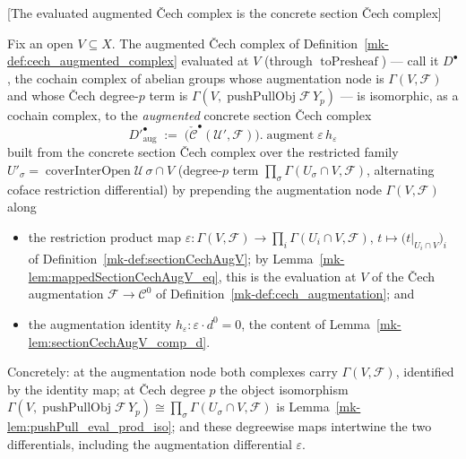 \begin{lemma}

[The evaluated augmented {\v C}ech complex is the concrete section {\v C}ech complex]
  \label{mk-lem:cechSection_complex_iso}

  Fix an open \(V \subseteq X\). The augmented {\v C}ech complex of
  Definition~\ref{mk-def:cech_augmented_complex} evaluated at \(V\) (through
  \(\operatorname{toPresheaf}\)) --- call it \(D^\bullet\), the cochain complex of abelian
  groups whose augmentation node is \(\Gamma(V, \mathcal{F})\) and whose {\v C}ech degree-\(p\)
  term is \(\Gamma(V, \operatorname{pushPullObj}\mathcal{F}\,Y_p)\) --- is isomorphic, as a
  cochain complex, to the \emph{augmented} concrete section {\v C}ech complex
  \[
    D'^\bullet_{\mathrm{aug}} \;:=\;
    \bigl(\check{\mathcal{C}}^\bullet(\mathcal{U}', \mathcal{F})\bigr).\operatorname{augment}
      \varepsilon\, h_\varepsilon
  \]
  built from the concrete section {\v C}ech complex over the restricted family
  \(U'_\sigma = \operatorname{coverInterOpen}\mathcal{U}\,\sigma \cap V\) (degree-\(p\) term
  \(\prod_\sigma \Gamma(U_\sigma \cap V, \mathcal{F})\), alternating coface restriction
  differential) by prepending the augmentation node \(\Gamma(V, \mathcal{F})\) along
  \begin{itemize}
    \item the restriction product map \(\varepsilon : \Gamma(V, \mathcal{F}) \to
      \prod_i \Gamma(U_i \cap V, \mathcal{F})\), \(t \mapsto \bigl(t|_{U_i \cap V}\bigr)_i\)
      of Definition~\ref{mk-def:sectionCechAugV}; by
      Lemma~\ref{mk-lem:mappedSectionCechAugV_eq}, this is the evaluation at \(V\) of the {\v C}ech
      augmentation \(\mathcal{F} \to \mathcal{C}^0\) of Definition~\ref{mk-def:cech_augmentation}; and
    \item the augmentation identity \(h_\varepsilon : \varepsilon \cdot d^0 = 0\), the
      content of Lemma~\ref{mk-lem:sectionCechAugV_comp_d}.
  \end{itemize}
  Concretely: at the augmentation node both complexes carry \(\Gamma(V, \mathcal{F})\),
  identified by the identity map; at {\v C}ech degree \(p\) the object isomorphism
  \(\Gamma(V, \operatorname{pushPullObj}\mathcal{F}\,Y_p) \cong \prod_\sigma \Gamma(U_\sigma
  \cap V, \mathcal{F})\) is Lemma~\ref{mk-lem:pushPull_eval_prod_iso}; and these degreewise maps
  intertwine the two differentials, including the augmentation differential \(\varepsilon\).
\end{lemma}
